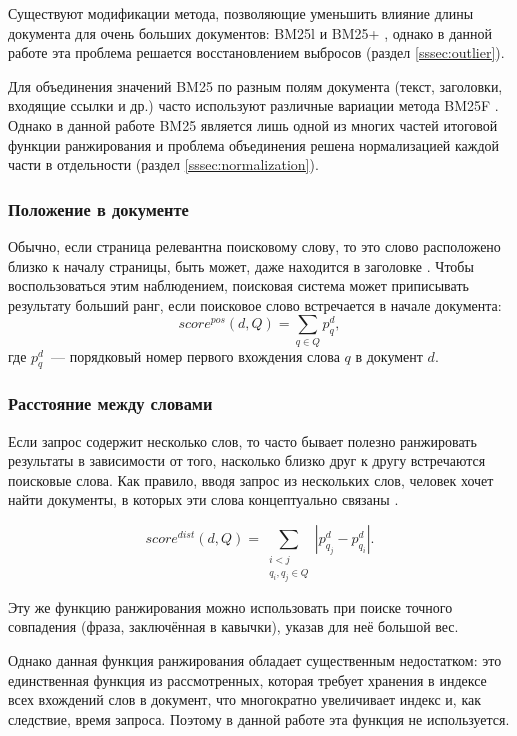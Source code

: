 Существуют модификации метода, позволяющие уменьшить влияние длины документа для очень больших документов: BM25l \cite{lv11+} и BM25+ \cite{lv11l}, однако в данной работе эта проблема решается восстановлением выбросов (раздел \ref{sssec:outlier}).

Для объединения значений BM25 по разным полям документа (текст, заголовки, входящие ссылки и др.) часто используют различные вариации метода BM25F \cite{robertson09}. Однако в данной работе BM25 является лишь одной из многих частей итоговой функции ранжирования и проблема объединения решена нормализацией каждой части в отдельности (раздел \ref{sssec:normalization}).


\subsubsection{Положение в документе} \label{sssec:position}
Обычно, если страница релевантна поисковому слову, то это слово расположено близко к началу страницы, быть может, даже находится в заголовке \cite{segaran07}. Чтобы воспользоваться этим наблюдением, поисковая система может приписывать результату больший ранг, если поисковое слово встречается в начале документа:
\begin{equation}
  score^{pos}(d, Q)=\sum_{q\in Q}p_q^d,
\end{equation}
где $p_q^d$~--- порядковый номер первого вхождения слова $q$ в документ $d$.


\subsubsection{Расстояние между словами}
Если запрос содержит несколько слов, то часто бывает полезно ранжировать результаты в зависимости от того, насколько близко друг к другу встречаются поисковые слова. Как правило, вводя запрос из нескольких слов, человек хочет найти документы, в которых эти слова концептуально связаны \cite{segaran07}.

\begin{equation}
  score^{dist}(d, Q)=\sum_{\substack{i<j \\ q_i, q_j\in Q}} |p_{q_j}^d - p_{q_i}^d|.
\end{equation}

Эту же функцию ранжирования можно использовать при поиске точного совпадения (фраза, заключённая в кавычки), указав для неё большой вес.

Однако данная функция ранжирования обладает существенным недостатком: это единственная функция из рассмотренных, которая требует хранения в индексе всех вхождений слов в документ, что многократно увеличивает индекс и, как следствие, время запроса. Поэтому в данной работе эта функция не используется.


